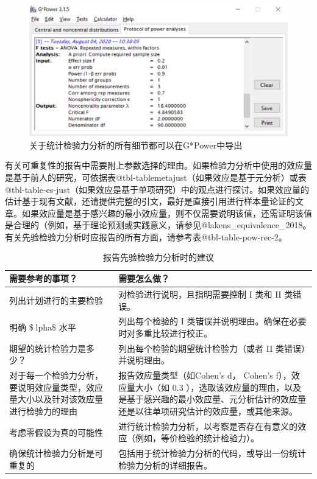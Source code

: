 \documentclass[
  letterpaper,
  DIV=11,
  numbers=noendperiod]{scrreprt}
\begin{document}
\begin{figure}

{\centering \includegraphics[width=1\textwidth,height=\textheight]{images/gpowprotocol.png}

}

\caption{\label{fig-gpowprotocol}关于统计检验力分析的所有细节都可以在G*Power中导出}

\end{figure}

有关可重复性的报告中需要附上参数选择的理由。如果检验力分析中使用的效应量是基于前人的研究，可依据表@tbl-tablemetajust（如果效应是基于元分析）或表@tbl-table-es-just（如果效应是基于单项研究）中的观点进行探讨。如果效应量的估计基于现有文献，还请提供完整的引文，最好是直接引用进行样本量论证的文章。如果效应量是基于感兴趣的最小效应量，则不仅需要说明该值，还需证明该值是合理的（例如，基于理论预测或实践意义，请参见@lakens\_equivalence\_2018。有关先验检验力分析时应报告的所有方面，请参考表@tbl-table-pow-rec-2。

\hypertarget{tbl-table-pow-rec-2}{}
\begin{table}
\caption{\label{tbl-table-pow-rec-2}报告先验检验力分析时的建议 }\tabularnewline

\centering
\begin{tabular}{>{\raggedright\arraybackslash}p{5cm}|>{\raggedright\arraybackslash}p{10cm}}
\hline
需要参考的事项？ & 需要怎么做？\\
\hline
列出计划进行的主要检验 & 对检验进行说明，且指明需要控制 I 类和 II 类错误。\\
\hline
明确 \$lpha\$ 水平 & 列出每个检验的 I 类错误并说明理由。确保在必要时对多重比较进行校正。\\
\hline
期望的统计检验力是多少？ & 列出每个检验的期望统计检验力（或者 II 类错误）并说明理由。\\
\hline
对于每一个检验力分析，要说明效应量类型，效应量大小以及针对该效应量进行检验力的理由 & 报告效应量类型（如Cohen's d， Cohen's f），效应量大小（如 0.3 ），选取该效应量的理由，以及是基于感兴趣的最小效应量、元分析估计的效应量还是以往单项研究估计的效应量，或其他来源。\\
\hline
考虑零假设为真的可能性 & 进行统计检验力分析，以考察是否存在有意义的效应（例如，等价检验的统计检验力）。\\
\hline
确保统计检验力分析是可重复的 & 包括用于统计检验力分析的代码，或导出一份统计检验力分析的详细报告。\\
\hline
\end{tabular}
\end{table}
\end{document}
